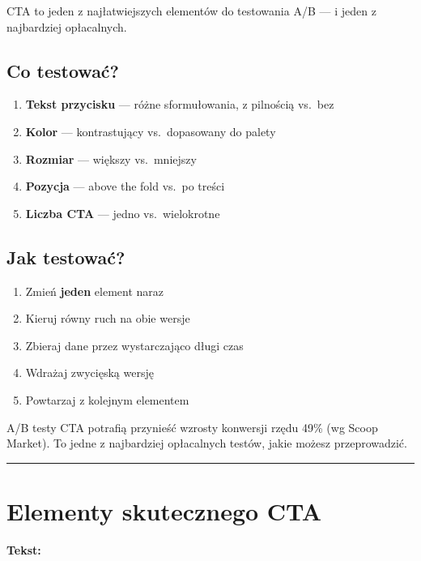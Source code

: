 \documentclass[
  12pt,
  a4paper,
  twoside,
  openright,
  12pt,
  DIV=12,
  BCOR=12mm]{scrbook}
\providecommand{\tightlist}{%
  \setlength{\itemsep}{0pt}\setlength{\parskip}{0pt}}\usepackage{longtable,booktabs,array}
\newcommand{\decoline}{%
  \begin{center}
    \textcolor{bordergray}{\rule{0.3\textwidth}{0.5pt}}
  \end{center}
}
\begin{document}
CTA to jeden z najłatwiejszych elementów do testowania A/B --- i jeden z
najbardziej opłacalnych.

\subsection{Co testować?}\label{co-testowaux107}

\begin{enumerate}
\def\labelenumi{\arabic{enumi}.}
\tightlist
\item
  \textbf{Tekst przycisku} --- różne sformułowania, z pilnością vs.~bez
\item
  \textbf{Kolor} --- kontrastujący vs.~dopasowany do palety
\item
  \textbf{Rozmiar} --- większy vs.~mniejszy
\item
  \textbf{Pozycja} --- above the fold vs.~po treści
\item
  \textbf{Liczba CTA} --- jedno vs.~wielokrotne
\end{enumerate}

\subsection{Jak testować?}\label{jak-testowaux107}

\begin{enumerate}
\def\labelenumi{\arabic{enumi}.}
\tightlist
\item
  Zmień \textbf{jeden} element naraz
\item
  Kieruj równy ruch na obie wersje
\item
  Zbieraj dane przez wystarczająco długi czas
\item
  Wdrażaj zwycięską wersję
\item
  Powtarzaj z kolejnym elementem
\end{enumerate}

\begin{wskazowka}
A/B testy CTA potrafią przynieść wzrosty konwersji rzędu 49\% (wg Scoop Market). To jedne z najbardziej opłacalnych testów, jakie możesz przeprowadzić.
\end{wskazowka}

\decoline

\section{Elementy skutecznego CTA}\label{elementy-skutecznego-cta}

\textbf{Tekst:}
\end{document}
